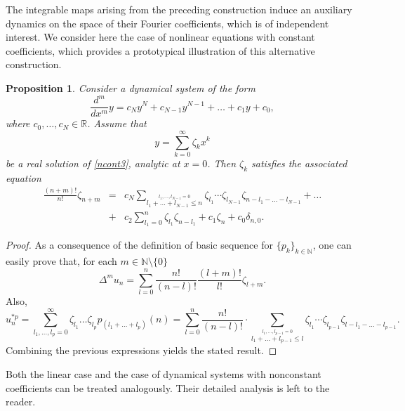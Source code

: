 \documentclass[10pt]{amsart}
\numberwithin{equation}{section}
\newtheorem{proposition}{Proposition}
\theoremstyle{definition}
\begin{document}
The integrable maps arising from the preceding construction induce an auxiliary
dynamics on the space of their Fourier coefficients, which is of independent
interest. We consider here the case of nonlinear equations with constant
coefficients, which provides a prototypical illustration of this alternative
construction.
\begin{proposition}
\label{prop2}
 Consider a dynamical system of the form
\begin{equation}
\frac{d^{m}}{dx^{m}}y= c_{N} y^{N}+c_{N-1} y^{N-1}+\ldots +c_{1} y+ c_{0},
\label{ncont3}
\end{equation}
where $c_{0},\ldots ,c_{N} \in \mathbb{R}$. Assume that
\begin{equation}
y=\sum _{k=0}^{\infty} \zeta _{k} x^{k}
\label{eq6.2}
\end{equation}
be a real solution of  \eqref{ncont3}, analytic at $x=0$. Then
$\zeta _{k}$ satisfies the associated equation
\begin{eqnarray}
\nonumber
\frac{(n+m)!}{n!}\zeta _{n+m}&=&c_{N}\sum _{
\overset{l_{1},\ldots ,l_{N-1}=0}{l_{1}+\ldots + l_{N-1}\leq n}}
\zeta _{l_{1}} \cdots \zeta _{l_{N-1}} \zeta _{n-l_{1}-\ldots -l_{N-1}}
+\ldots
\\
&+&c_{2} \sum _{l_{1}=0}^{n}\zeta _{l_{1}} \zeta _{n-l_{1}}+c_{1}
\zeta _{n} +c_{0}\delta_{n,0}.
\label{eq6.3}
\end{eqnarray}
\end{proposition}
\begin{proof}
As a consequence of the definition of basic sequence for
$\{p_{k}\}_{k\in \mathbb{N}}$, one can easily prove that, for each
$m\in \mathbb{N}\setminus \{0\}$
\begin{equation}
\Delta ^{m} u_{n}=\sum _{l=0}^{n}\frac{n!}{(n-l)!} \frac{(l+m)!}{l!}
\zeta _{l+m}.
\label{eq6.4}
\end{equation}
Also,
\begin{equation}
u_{n}^{*p}=\sum _{l_{1},\ldots ,l_{p}=0}^{\infty}\zeta _{l_{1}}
\ldots \zeta _{l_{p}}p_{(l_{1}+\ldots +l_{p})}(n)=\sum _{l=0}^{n}
\frac{n!}{(n-l)!}\cdot \sum _{
\overset{l_{1},\ldots ,l_{p-1}=0}{l_{1}+\ldots + l_{p-1}\leq l}}
\zeta _{l_{1}} \cdots \zeta _{l_{p-1}} \zeta _{l-l_{1}-\ldots -l_{p-1}}.
\label{eq6.5}
\end{equation}
Combining the previous expressions yields the stated result.
\end{proof}
Both the linear case and the case of dynamical systems with nonconstant
coefficients can be treated analogously. Their detailed analysis is left
to the reader.
\end{document}
